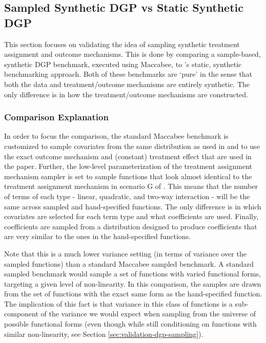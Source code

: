 \documentclass[../main.tex]{subfiles}
\begin{document}
\subsection{Sampled Synthetic DGP vs Static Synthetic DGP}

This section focuses on validating the idea of sampling synthetic treatment assignment and outcome mechanisms. This is done by comparing a sample-based, synthetic DGP benchmark, executed using Maccabee, to \citeauthor{Diamond2013GeneticStudies}'s static, synthetic benchmarking approach. Both of these benchmarks are `pure' in the sense that both the data and treatment/outcome mechanisms are entirely synthetic. The only difference is in how the treatment/outcome mechanisms are constructed.

\subsubsection{Comparison Explanation}

In order to focus the comparison, the standard Maccabee benchmark is customized to sample covariates from the same distribution as used in \textcite{Diamond2013GeneticStudies} and to use the exact outcome mechanism and (constant) treatment effect that are used in the paper. Further, the low-level parameterization of the treatment assignment mechanism sampler is set to sample functions that look almost identical to the treatment assignment mechanism in scenario G of \textcite{Diamond2013GeneticStudies}. This means that the number of terms of each type - linear, quadratic, and two-way interaction - will be the same across sampled and hand-specified functions. The only difference is in which covariates are selected for each term type and what coefficients are used. Finally, coefficients are sampled from a distribution designed to produce coefficients that are very similar to the ones in the hand-specified functions.

\vspace{\baselineskip}

Note that this is a much lower variance setting (in terms of variance over the sampled functions) than a standard Maccabee sampled benchmark. A standard sampled benchmark would sample a set of functions with varied functional forms, targeting a given level of non-linearity. In this comparison, the samples are drawn from the set of functions with the exact same form as the hand-specified function. The implication of this fact is that variance in this class of functions is a sub-component of the variance we would expect when sampling from the universe of possible functional forms (even though while still conditioning on functions with similar non-linearity, see Section \ref{sec:validation-dgp-sampling}).
\end{document}

